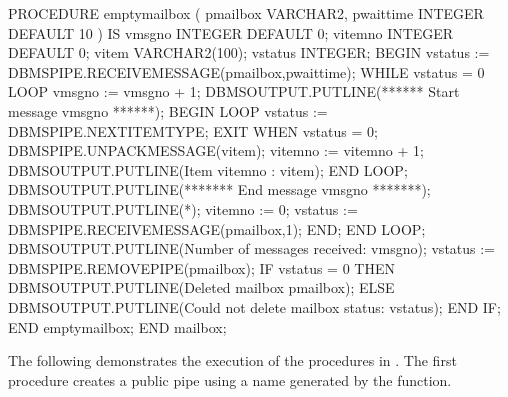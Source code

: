 \documentclass[letterpaper,10pt,english,openany,oneside]{sphinxmanual}
\begin{document}
\begin{sphinxVerbatim}[commandchars=\\\{\}]
    PROCEDURE empty\PYGZus{}mailbox (
        p\PYGZus{}mailbox   VARCHAR2,
        p\PYGZus{}waittime  INTEGER DEFAULT 10
    )
    IS
        v\PYGZus{}msgno     INTEGER DEFAULT 0;
        v\PYGZus{}itemno    INTEGER DEFAULT 0;
        v\PYGZus{}item      VARCHAR2(100);
        v\PYGZus{}status    INTEGER;
    BEGIN
        v\PYGZus{}status := DBMS\PYGZus{}PIPE.RECEIVE\PYGZus{}MESSAGE(p\PYGZus{}mailbox,p\PYGZus{}waittime);
        WHILE v\PYGZus{}status = 0 LOOP
            v\PYGZus{}msgno := v\PYGZus{}msgno + 1;
            DBMS\PYGZus{}OUTPUT.PUT\PYGZus{}LINE(\PYGZsq{}****** Start message \PYGZsh{}\PYGZsq{} \textbar{}\textbar{} v\PYGZus{}msgno \textbar{}\textbar{}
                \PYGZsq{} ******\PYGZsq{});
            BEGIN
                LOOP
                    v\PYGZus{}status := DBMS\PYGZus{}PIPE.NEXT\PYGZus{}ITEM\PYGZus{}TYPE;
                    EXIT WHEN v\PYGZus{}status = 0;
                    DBMS\PYGZus{}PIPE.UNPACK\PYGZus{}MESSAGE(v\PYGZus{}item);
                    v\PYGZus{}itemno := v\PYGZus{}itemno + 1;
                    DBMS\PYGZus{}OUTPUT.PUT\PYGZus{}LINE(\PYGZsq{}Item \PYGZsh{}\PYGZsq{} \textbar{}\textbar{} v\PYGZus{}itemno \textbar{}\textbar{} \PYGZsq{}: \PYGZsq{} \textbar{}\textbar{}
                        v\PYGZus{}item);
                END LOOP;
                DBMS\PYGZus{}OUTPUT.PUT\PYGZus{}LINE(\PYGZsq{}******* End message \PYGZsh{}\PYGZsq{} \textbar{}\textbar{} v\PYGZus{}msgno \textbar{}\textbar{}
                    \PYGZsq{} *******\PYGZsq{});
                DBMS\PYGZus{}OUTPUT.PUT\PYGZus{}LINE(\PYGZsq{}*\PYGZsq{});
                v\PYGZus{}itemno := 0;
                v\PYGZus{}status := DBMS\PYGZus{}PIPE.RECEIVE\PYGZus{}MESSAGE(p\PYGZus{}mailbox,1);
            END;
        END LOOP;
        DBMS\PYGZus{}OUTPUT.PUT\PYGZus{}LINE(\PYGZsq{}Number of messages received: \PYGZsq{} \textbar{}\textbar{} v\PYGZus{}msgno);
        v\PYGZus{}status := DBMS\PYGZus{}PIPE.REMOVE\PYGZus{}PIPE(p\PYGZus{}mailbox);
        IF v\PYGZus{}status = 0 THEN
            DBMS\PYGZus{}OUTPUT.PUT\PYGZus{}LINE(\PYGZsq{}Deleted mailbox \PYGZsq{} \textbar{}\textbar{} p\PYGZus{}mailbox);
        ELSE
            DBMS\PYGZus{}OUTPUT.PUT\PYGZus{}LINE(\PYGZsq{}Could not delete mailbox \PYGZhy{} status: \PYGZsq{}
                \textbar{}\textbar{} v\PYGZus{}status);
        END IF;
    END empty\PYGZus{}mailbox;
END mailbox;
\end{sphinxVerbatim}

\newpage

The following demonstrates the execution of the procedures in .
The first procedure creates a public pipe using a name generated by the
 function.
\end{document}
